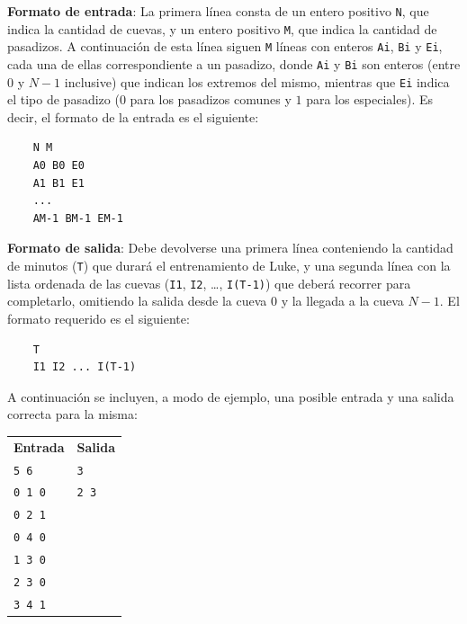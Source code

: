     \vspace{1.25em}

    \textbf{Formato de entrada}: La primera línea consta de un entero positivo
    \texttt{N}, que indica la cantidad de cuevas, y un entero positivo
    \texttt{M}, que indica la cantidad de pasadizos. A continuación de esta
    línea siguen \texttt{M} líneas con enteros \texttt{Ai}, \texttt{Bi} y
    \texttt{Ei}, cada una de ellas correspondiente a un pasadizo, donde
    \texttt{Ai} y \texttt{Bi} son enteros (entre $0$ y $N-1$ inclusive) que
    indican los extremos del mismo, mientras que \texttt{Ei} indica
    el tipo de pasadizo ($0$ para los pasadizos comunes y $1$ para los
    especiales). Es decir, el formato de la entrada es el siguiente:

    \begin{verbatim}
    N M
    A0 B0 E0
    A1 B1 E1
    ...
    AM-1 BM-1 EM-1\end{verbatim}

    \vspace{.8em}

    \textbf{Formato de salida}: Debe devolverse una primera línea conteniendo
    la cantidad de minutos (\texttt{T}) que durará el entrenamiento de Luke,
    y una segunda línea con la lista ordenada de las cuevas (\texttt{I1},
    \texttt{I2}, \dots, \texttt{I(T-1)}) que deberá recorrer para
    completarlo, omitiendo la salida desde la cueva $0$ y la llegada a la
    cueva $N-1$. El formato requerido es el siguiente:

    \begin{verbatim}
    T
    I1 I2 ... I(T-1)\end{verbatim}

    \vspace{.8em}

    A continuación se incluyen, a modo de ejemplo, una posible entrada y una
    salida correcta para la misma:

    \vspace{.5em}
    \begin{tabular}{l @{\hskip 4em} l}
    \textbf{Entrada} & \textbf{Salida} \\
    \texttt{5 6}     & \texttt{3}      \\
    \texttt{0 1 0}   & \texttt{2 3}    \\
    \texttt{0 2 1}   &                 \\
    \texttt{0 4 0}   &                 \\
    \texttt{1 3 0}   &                 \\
    \texttt{2 3 0}   &                 \\
    \texttt{3 4 1}   &                 \\
    \end{tabular}
    \vspace{.5em}

